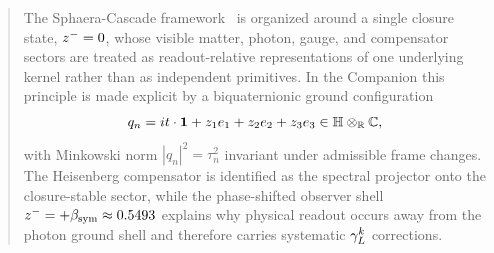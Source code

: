 \begin{abstract}
The Sphaera-Cascade framework~\cite{brendecke2026main} is organized around a single closure state, $\zminus=0$, whose visible matter, photon, gauge, and compensator sectors are treated as readout-relative representations of one underlying kernel rather than as independent primitives. In the Companion this principle is made explicit by a biquaternionic ground configuration
\[
q_n = it\cdot\mathbf{1} + z_1 e_1 + z_2 e_2 + z_3 e_3
\in \HH\otimes_{\mathbb{R}}\mathbb{C},
\]
with Minkowski norm $|q_n|^2=\tau_n^2$ invariant under admissible frame changes. The Heisenberg compensator is identified as the spectral projector onto the closure-stable sector, while the phase-shifted observer shell $\zminus=+\bsym\approx 0.5493$ explains why physical readout occurs away from the photon ground shell and therefore carries systematic $\gL^k$ corrections.


\end{abstract}
